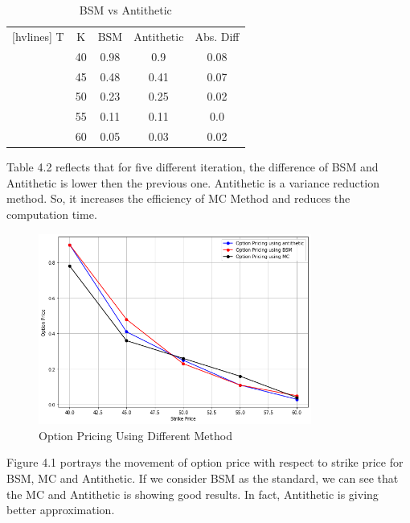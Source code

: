 \begin{table} [H]
\begin{center}
	\begin{NiceTabular}{|c|c|c|c|c|}[hvlines]
		 T & K & BSM & Antithetic & Abs. Diff \\ 
		& 40 &   0.98 &   0.9 &   0.08 \\
		& 45 &   0.48 &   0.41 &   0.07 \\
		& 50 &   0.23 &   0.25 &   0.02 \\ 
		& 55 &   0.11 &   0.11 &   0.0 \\
		& 60 &   0.05 &   0.03 &   0.02 \\
	\end{NiceTabular}
\end{center}
\caption{BSM vs Antithetic}
\end{table}

\noindent Table 4.2 reflects that for five different iteration, the difference of BSM and Antithetic is lower then the previous one. Antithetic is a variance reduction method. So, it increases the efficiency of MC Method and reduces the computation time.

\begin{figure}[H]
	\begin{center}
		\includegraphics[width=0.8\textwidth]{Option_Pricing_Using_Different_Method}
	\end{center}
	\caption{Option Pricing Using Different Method}
\end{figure}


\noindent Figure 4.1 portrays the movement of option price with respect to strike price for BSM, MC and Antithetic. If we consider BSM as the standard, we can see that the MC and Antithetic is showing good results. In fact, Antithetic is giving better approximation. 

